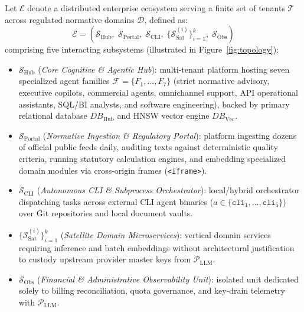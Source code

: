 \documentclass[10pt,twocolumn]{article}
\begin{document}
Let $\mathcal{E}$ denote a distributed enterprise ecosystem serving a finite set of tenants $\mathcal{T}$ across regulated normative domains $\mathcal{D}$, defined as:
\begin{equation}
\mathcal{E} = \left(\mathcal{S}_{\mathrm{Hub}}, \; \mathcal{S}_{\mathrm{Portal}}, \; \mathcal{S}_{\mathrm{CLI}}, \; \{\mathcal{S}_{\mathrm{Sat}}^{(i)}\}_{i=1}^{k}, \; \mathcal{S}_{\mathrm{Obs}}\right)
\end{equation}
comprising five interacting subsystems (illustrated in Figure~\ref{fig:topology}):
\begin{itemize}[leftmargin=1.3em,itemsep=2pt,topsep=3pt]
  \item $\mathcal{S}_{\mathrm{Hub}}$ (\emph{Core Cognitive \& Agentic Hub}): multi-tenant platform hosting seven specialized agent families $\mathcal{F} = \{F_1, \dots, F_7\}$ (strict normative advisory, executive copilots, commercial agents, omnichannel support, API operational assistants, SQL/BI analysts, and software engineering), backed by primary relational database $DB_{\mathrm{Hub}}$ and HNSW vector engine $DB_{\mathrm{Vec}}$.
  \item $\mathcal{S}_{\mathrm{Portal}}$ (\emph{Normative Ingestion \& Regulatory Portal}): platform ingesting dozens of official public feeds daily, auditing texts against deterministic quality criteria, running statutory calculation engines, and embedding specialized domain modules via cross-origin frames (\texttt{<iframe>}).
  \item $\mathcal{S}_{\mathrm{CLI}}$ (\emph{Autonomous CLI \& Subprocess Orchestrator}): local/hybrid orchestrator dispatching tasks across external CLI agent binaries ($a \in \{\texttt{cli}_1, \dots, \texttt{cli}_5\}$) over Git repositories and local document vaults.
  \item $\{\mathcal{S}_{\mathrm{Sat}}^{(i)}\}_{i=1}^{k}$ (\emph{Satellite Domain Microservices}): vertical domain services requiring inference and batch embeddings without architectural justification to custody upstream provider master keys from $\mathcal{P}_{\mathrm{LLM}}$.
  \item $\mathcal{S}_{\mathrm{Obs}}$ (\emph{Financial \& Administrative Observability Unit}): isolated unit dedicated solely to billing reconciliation, quota governance, and key-drain telemetry with $\mathcal{P}_{\mathrm{LLM}}$.
\end{itemize}
\end{document}
